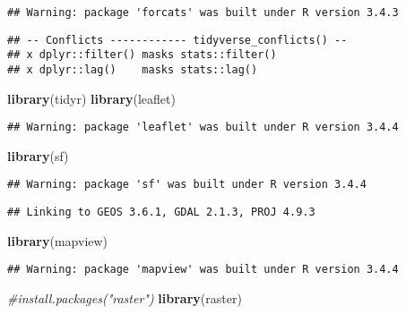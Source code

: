 \documentclass[]{article}
\newenvironment{Shaded}{\begin{snugshade}}{\end{snugshade}}
\newcommand{\KeywordTok}[1]{\textcolor[rgb]{0.13,0.29,0.53}{\textbf{#1}}}
\newcommand{\CommentTok}[1]{\textcolor[rgb]{0.56,0.35,0.01}{\textit{#1}}}
\newcommand{\NormalTok}[1]{#1}
\begin{document}
\begin{verbatim}
## Warning: package 'forcats' was built under R version 3.4.3
\end{verbatim}

\begin{verbatim}
## -- Conflicts ------------ tidyverse_conflicts() --
## x dplyr::filter() masks stats::filter()
## x dplyr::lag()    masks stats::lag()
\end{verbatim}

\begin{Shaded}
\begin{Highlighting}[]
\KeywordTok{library}\NormalTok{(tidyr)}
\KeywordTok{library}\NormalTok{(leaflet)}
\end{Highlighting}
\end{Shaded}

\begin{verbatim}
## Warning: package 'leaflet' was built under R version 3.4.4
\end{verbatim}

\begin{Shaded}
\begin{Highlighting}[]
\KeywordTok{library}\NormalTok{(sf)}
\end{Highlighting}
\end{Shaded}

\begin{verbatim}
## Warning: package 'sf' was built under R version 3.4.4
\end{verbatim}

\begin{verbatim}
## Linking to GEOS 3.6.1, GDAL 2.1.3, PROJ 4.9.3
\end{verbatim}

\begin{Shaded}
\begin{Highlighting}[]
\KeywordTok{library}\NormalTok{(mapview)}
\end{Highlighting}
\end{Shaded}

\begin{verbatim}
## Warning: package 'mapview' was built under R version 3.4.4
\end{verbatim}

\begin{Shaded}
\begin{Highlighting}[]
\CommentTok{#install.packages("raster")}
\KeywordTok{library}\NormalTok{(raster)}
\end{Highlighting}
\end{Shaded}
\end{document}
